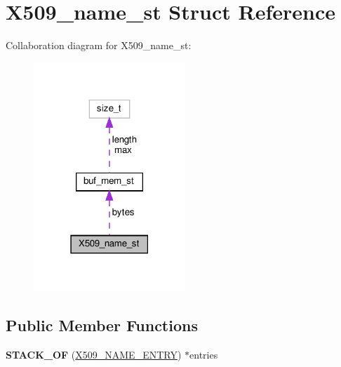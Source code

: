 \hypertarget{structX509__name__st}{}\section{X509\+\_\+name\+\_\+st Struct Reference}
\label{structX509__name__st}


Collaboration diagram for X509\+\_\+name\+\_\+st\+:
\nopagebreak
\begin{figure}[H]
\begin{center}
\leavevmode
\includegraphics[width=162pt]{structX509__name__st__coll__graph}
\end{center}
\end{figure}
\subsection*{Public Member Functions}
\begin{DoxyCompactItemize}
\item 
\mbox{\label{structX509__name__st_a1a96008fa7f511e0836cf506e14ee1eb}} 
{\bfseries S\+T\+A\+C\+K\+\_\+\+OF} (\hyperlink{structX509__name__entry__st}{X509\+\_\+\+N\+A\+M\+E\+\_\+\+E\+N\+T\+RY}) $\ast$entries
\end{DoxyCompactItemize}
